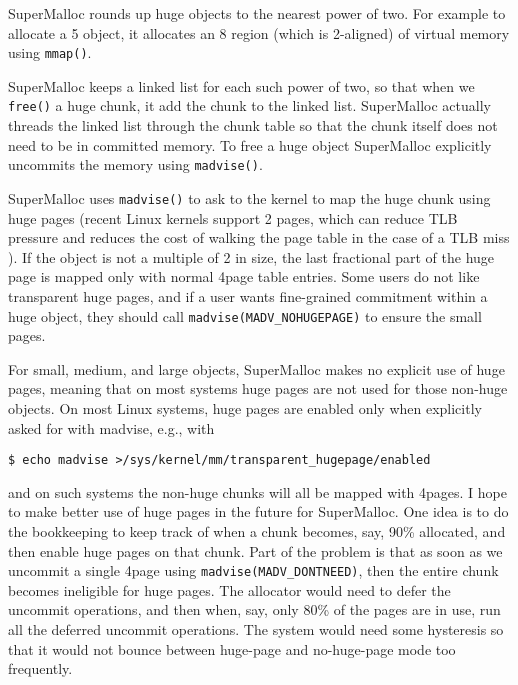 \documentclass[natbib,sort&compress]{sigplanconf}
\newcommand{\code}[1]{\texttt{#1}}
\begin{document}
SuperMalloc rounds up huge objects to the nearest power of two.  For
example to allocate a \unit{5}\mebi\byte{} object, it allocates an
\unit{8}\mebi\byte{} region (which is \unit{2}\mebi\byte{}-aligned) of
virtual memory using \code{mmap()}.

SuperMalloc keeps a linked list for each such power of two, so that
when we \code{free()} a huge chunk, it add the chunk to the linked
list.  SuperMalloc actually threads the linked list through the chunk
table so that the chunk itself does not need to be in committed
memory.  To free a huge object SuperMalloc explicitly uncommits the
memory using \code{madvise()}.

SuperMalloc uses \code{madvise()} to ask to the kernel to map the huge
chunk using huge pages (recent Linux kernels support
\unit{2}\mebi\byte{} pages, which can reduce TLB pressure and reduces
the cost of walking the page table in the case of a TLB miss
\cite{Corbet11}).  If the object is not a multiple of
\unit{2}\mebi\byte{} in size, the last fractional part of the huge
page is mapped only with normal \unit{4}\kibi\byte page table entries.
Some users do not like transparent huge pages, and if a user wants
fine-grained commitment within a huge object, they should call
\code{madvise(MADV_NOHUGEPAGE)} to ensure the small pages.

For small, medium, and large objects, SuperMalloc makes no explicit
use of huge pages, meaning that on most systems huge pages are not
used for those non-huge objects.  On most Linux systems, huge pages are enabled
only when explicitly asked for with madvise, e.g., with
\begin{verbatim}
$ echo madvise >/sys/kernel/mm/transparent_hugepage/enabled
\end{verbatim}
and on such systems the non-huge chunks will all be mapped with
\unit{4}\kibi\byte pages.  I hope to make better use of huge pages in
the future for SuperMalloc.  One idea is to do the bookkeeping to keep
track of when a chunk becomes, say, 90\% allocated, and then enable
huge pages on that chunk.  Part of the problem is that as soon as we
uncommit a single \unit{4}\kibi\byte page using
\code{madvise(MADV_DONTNEED)}, then the entire chunk becomes
ineligible for huge pages.  The allocator would need to defer the
uncommit operations, and then when, say, only 80\% of the pages are in
use, run all the deferred uncommit operations.  The system would need
some hysteresis so that it would not bounce between huge-page and
no-huge-page mode too frequently.
\end{document}
